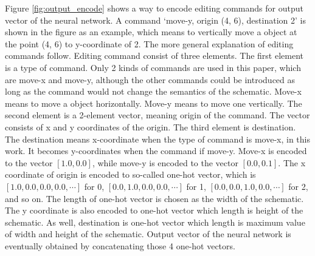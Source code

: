 \documentclass[twocolumn]{article}
\begin{document}
Figure \ref{fig:output_encode} shows a way to encode editing commands
for output vector of the neural network.
A command `move-y, origin (4, 6), destination 2' is shown in the figure
as an example, which means to vertically move a object at the point (4, 6)
to y-coordinate of 2.
The more general explanation of editing commands follow.
Editing command consist of three elements.
The first element is a type of command.
Only 2 kinds of commands are used in this paper,
which are move-x and move-y,
although the other commands could be introduced as long as
the command would not change the semantics of the schematic.
Move-x means to move a object horizontally.
Move-y means to move one vertically.
The second element is a 2-element vector, meaning origin of the command.
The vector consists of x and y coordinates of the origin.
The third element is destination.
The destination means x-coordinate when the type of command
is move-x, in this work.
It becomes y-coordinates when the command if move-y.
Move-x is encoded to the vector $[1.0, 0.0]$, 
while move-y is encoded to the vector $[0.0, 0.1]$. 
The x coordinate of origin is encoded to so-called one-hot vector,
which is
$[1.0, 0.0, 0.0, 0.0, \cdots]$ for 0,
$[0.0, 1.0, 0.0, 0.0, \cdots]$ for 1, 
$[0.0, 0.0, 1.0, 0.0, \cdots]$ for 2,
and so on. The length of one-hot vector is chosen as the width of
the schematic.
The y coordinate is also encoded to one-hot vector which length is
height of the schematic.
As well, destination is one-hot vector which length is
maximum value of width and height of the schematic.
Output vector of the neural network is eventually obtained
by concatenating those 4 one-hot vectors.
\end{document}
